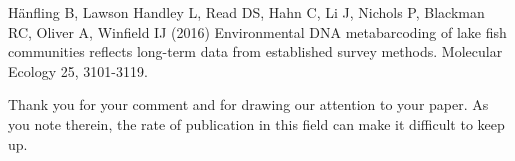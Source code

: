 \documentclass{article}
\newenvironment{response}
	{
	\begin{adjustwidth}{1cm}{0cm}
	\color{peerjBlue}
	}
	{
	\end{adjustwidth}
	}
\begin{document}
Hänfling B, Lawson Handley L, Read DS, Hahn C, Li J, Nichols P, Blackman RC, Oliver A, Winfield IJ (2016) Environmental DNA metabarcoding of lake fish communities reflects long-term data from established survey methods. Molecular Ecology 25, 3101-3119.
\begin{response}
  Thank you for your comment and for drawing our attention to your paper. As you note therein, the rate of publication in this field can make it difficult to keep up.

\end{response}
\end{document}
